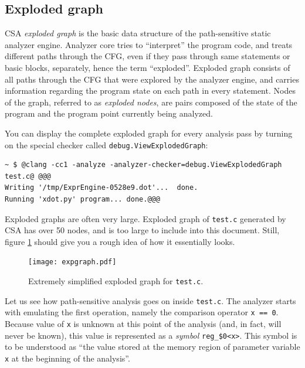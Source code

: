 \documentclass[a4paper,12pt]{article}
\newenvironment{nobr}{\begin{minipage}{\textwidth}\setlength\parskip{1em}
}{\end{minipage}\ignorespacesafterend}
\begin{document}
\subsection{Exploded graph}\label{subsec:exploded_graph}

CSA \emph{exploded graph} is the basic data structure of the path-sensitive static analyzer engine. Analyzer core tries to ``interpret'' the program code, and treats different paths through the CFG, even if they pass through same statements or basic blocks, separately, hence the term ``exploded''. Exploded graph consists of all paths through the CFG that were explored by the analyzer engine, and carries information regarding the program state on each path in every statement. Nodes of the graph, referred to as \emph{exploded nodes}, are pairs composed of the state of the program and the program point currently being analyzed.

\begin{nobr}
You can display the complete exploded graph for every analysis pass by turning on the special checker called \lstinline|debug.ViewExplodedGraph|:

\begin{lstlisting}[style=commandline]
~ $ @clang -cc1 -analyze -analyzer-checker=debug.ViewExplodedGraph test.c@ @@@
Writing '/tmp/ExprEngine-0528e9.dot'...  done. 
Running 'xdot.py' program... done.@@@
\end{lstlisting}
\end{nobr}

Exploded graphs are often very large. Exploded graph of \lstinline|test.c| generated by CSA has over 50 nodes, and is too large to include into this document. Still, figure \ref{fig:expgraph} should give you a rough idea of how it essentially looks. 

\begin{figure}[!ht]\center
\texttt{[image: expgraph.pdf]}
\caption{Extremely simplified exploded graph for \lstinline|test.c|.}
\label{fig:expgraph}
\end{figure}

Let us see how path-sensitive analysis goes on inside \lstinline|test.c|. The analyzer starts with emulating the first operation, namely the comparison operator \lstinline|x == 0|. Because value of \lstinline|x| is unknown at this point of the analysis (and, in fact, will never be known), this value is represented as a \emph{symbol} \lstinline|reg_$0<x>|. This symbol is to be understood as ``the value stored at the memory region of parameter variable \lstinline|x| at the beginning of the analysis''.
\end{document}
